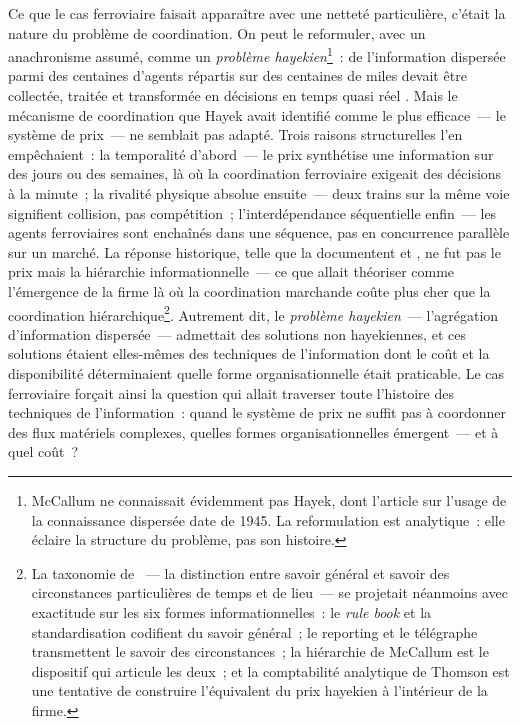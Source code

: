 Ce que le cas ferroviaire faisait apparaître avec une netteté particulière, c'était la nature du problème de coordination. On peut le reformuler, avec un anachronisme assumé, comme un \emph{problème hayekien}\footnote{McCallum ne connaissait évidemment pas Hayek, dont l'article sur l'usage de la connaissance dispersée date de 1945. La reformulation est analytique~: elle éclaire la structure du problème, pas son histoire.}~: de l'information dispersée parmi des centaines d'agents répartis sur des centaines de miles devait être collectée, traitée et transformée en décisions en temps quasi réel \parencite{hayek_use_1945}. Mais le mécanisme de coordination que Hayek avait identifié comme le plus efficace~--- le système de prix~--- ne semblait pas adapté. Trois raisons structurelles l'en empêchaient~: la temporalité d'abord~--- le prix synthétise une information sur des jours ou des semaines, là où la coordination ferroviaire exigeait des décisions à la minute~; la rivalité physique absolue ensuite~--- deux trains sur la même voie signifient collision, pas compétition~; l'interdépendance séquentielle enfin~--- les agents ferroviaires sont enchaînés dans une séquence, pas en concurrence parallèle sur un marché. La réponse historique, telle que la documentent \textcite{chandler_visible_1977} et \textcite{beniger_control_1986}, ne fut pas le prix mais la hiérarchie informationnelle~--- ce que \textcite{coase_nature_1937} allait théoriser comme l'émergence de la firme là où la coordination marchande coûte plus cher que la coordination hiérarchique\footnote{La taxonomie de \textcite{hayek_use_1945}~--- la distinction entre savoir général et savoir des circonstances particulières de temps et de lieu~--- se projetait néanmoins avec exactitude sur les six formes informationnelles~: le \emph{rule book} et la standardisation codifient du savoir général~; le reporting et le télégraphe transmettent le savoir des circonstances~; la hiérarchie de McCallum est le dispositif qui articule les deux~; et la comptabilité analytique de Thomson est une tentative de construire l'équivalent du prix hayekien à l'intérieur de la firme.}. Autrement dit, le \emph{problème hayekien}~--- l'agrégation d'information dispersée~--- admettait des solutions non hayekiennes, et ces solutions étaient elles-mêmes des techniques de l'information dont le coût et la disponibilité déterminaient quelle forme organisationnelle était praticable. Le cas ferroviaire forçait ainsi la question qui allait traverser toute l'histoire des techniques de l'information~: quand le système de prix ne suffit pas à coordonner des flux matériels complexes, %
quelles formes organisationnelles émergent~--- et à quel coût~?

